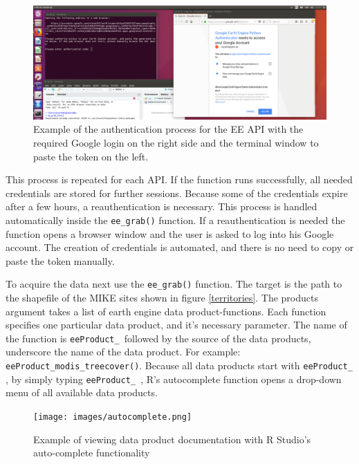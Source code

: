 \begin{center}
	\begin{figure}[h]
		\begin{center}
			\includegraphics[width=15cm]{images/install_authentication.png}
			\caption{Example of the authentication process for the EE API with the required Google login on the right side and the terminal window to paste the token on the left.}
			\label{install}
		\end{center}
	\end{figure}
\end{center}



This process is repeated for each API. If the function runs successfully, all needed credentials are stored for further sessions. Because some of the credentials expire after a few hours, a reauthentication is necessary. This process is handled automatically inside the \texttt{ee\_grab()} function. If a reauthentication is needed the function opens a browser window and the user is asked to log into his Google account. The creation of credentials is automated, and there is no need to copy or paste the token manually.

To acquire the data next use the \texttt{ee\_grab()} function. The target is the path to the shapefile of the MIKE sites shown in figure \ref{territories}. The products argument takes a list of earth engine data product-functions. Each function specifies one particular data product, and it's necessary parameter. The name of the function is \texttt{eeProduct\_ }followed by the source of the data products, underscore the name of the data product. For example: \texttt{eeProduct\_modis\_treecover()}. Because all data products start with \texttt{eeProduct\_ }, by simply typing \texttt{eeProduct\_ }, R's autocomplete function opens a drop-down menu of all available data products. 

\begin{center}
	\begin{figure}[h]
		\begin{center}
			\texttt{[image: images/autocomplete.png]}
			\caption{Example of viewing data product documentation with R Studio's auto-complete functionality}
			\label{install}
		\end{center}
	\end{figure}
\end{center}



